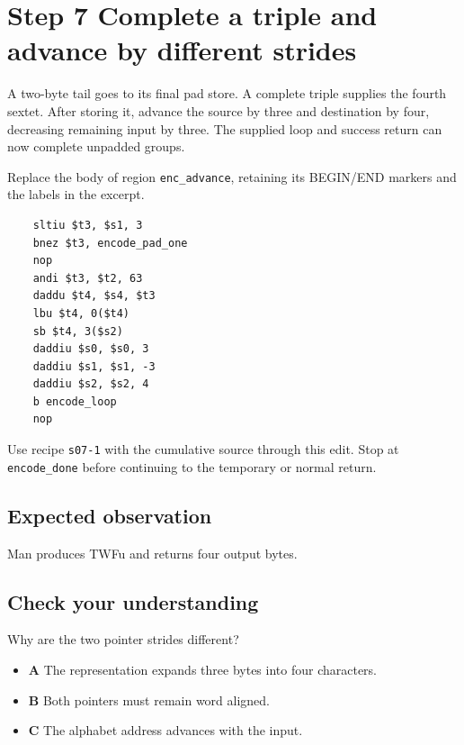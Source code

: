\section{Step 7 Complete a triple and advance by different strides}\label{base64-s07}

A two-byte tail goes to its final pad store. A complete triple supplies the fourth sextet. After storing it, advance the source by three and destination by four, decreasing remaining input by three. The supplied loop and success return can now complete unpadded groups.

Replace the body of region \texttt{enc\_advance}, retaining its BEGIN/END markers and the labels in the excerpt.

\begin{verbatim}
    sltiu $t3, $s1, 3
    bnez $t3, encode_pad_one
    nop
    andi $t3, $t2, 63
    daddu $t4, $s4, $t3
    lbu $t4, 0($t4)
    sb $t4, 3($s2)
    daddiu $s0, $s0, 3
    daddiu $s1, $s1, -3
    daddiu $s2, $s2, 4
    b encode_loop
    nop
\end{verbatim}

Use recipe \texttt{s07-1} with the cumulative source through this edit. Stop at \texttt{encode\_done} before continuing to the temporary or normal return.

\subsection{Expected observation}
Man produces TWFu and returns four output bytes.

\subsection{Check your understanding}
Why are the two pointer strides different?

\begin{itemize}
  \item \textbf{A} The representation expands three bytes into four characters.
  \item \textbf{B} Both pointers must remain word aligned.
  \item \textbf{C} The alphabet address advances with the input.
\end{itemize}
